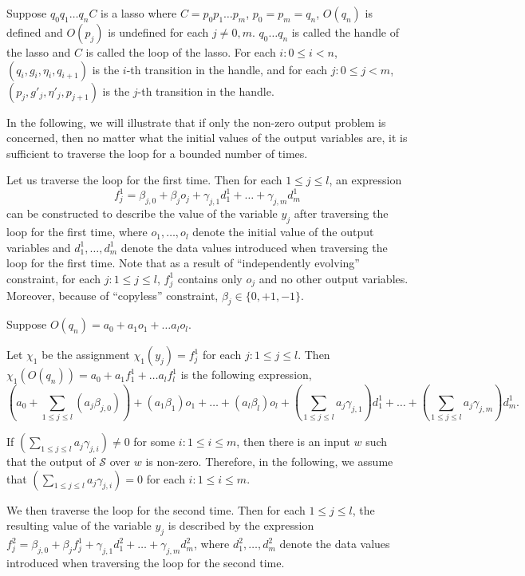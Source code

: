 \documentclass[runningheads,a4paper]{llncs}
\def\Ss{{\mathcal{S} }}
\begin{document}
Suppose $q_0 q_1 \dots q_n C$ is a lasso where $C=p_0 p_1 \dots p_m$, $p_0 = p_m=q_n$, $O(q_n)$ is defined and $O(p_j)$ is undefined for each $j \neq 0,m$. $q_0 \dots q_n$ is called the handle of the lasso and $C$ is called the loop of the lasso. For each $i: 0 \le i < n$, $(q_i, g_i, \eta_i, q_{i+1})$ is the $i$-th transition in the handle, and for each $j: 0 \le j < m$, $(p_j, g'_j, \eta'_j, p_{j+1})$ is the $j$-th transition in the handle. 

In the following, we will illustrate that if only the non-zero output problem is concerned, then no matter what the initial values of the output variables are, it is sufficient to traverse the loop for a bounded number of times.


Let us traverse the loop for the first time. Then for each $1 \le j \le l$, an expression 
\[f^1_{j} = \beta_{j,0} + \beta_{j} o_{j} + \gamma_{j,1} d^1_1 + \dots + \gamma_{j,m} d^1_m\] 
can be constructed to describe the value of the variable $y_{j}$ after traversing the loop for the first time, where $o_1,\dots,o_l$ denote the initial value of the output variables and $d^1_1, \dots, d^1_m$ denote the data values introduced when traversing the loop for the first time. Note that as a result of ``independently evolving'' constraint, for each $j: 1 \le j \le l$, $f^1_{j}$ contains only $o_{j}$ and no other output variables. Moreover, because of ``copyless'' constraint, $\beta_j \in \{0,+1,-1\}$.

Suppose $O(q_n)=a_0 + a_1 o_1 + \dots a_l o_l$. 

Let $\chi_1$ be the assignment $\chi_1(y_j)=f^1_j$ for each $j: 1\le j \le l$.
Then $\chi_1(O(q_n)) = a_0+ a_1 f^1_1 + \dots a_l f^1_l$ is the following expression,
\[
(a_0 + \sum \limits_{1 \le j \le l} (a_j\beta_{j,0})) +  (a_1 \beta_1) o_1 + \dots + (a_l \beta_l) o_l + (\sum \limits_{1 \le j \le l} a_j \gamma_{j,1}) d^1_1 + \dots + (\sum \limits_{1 \le j \le l} a_j \gamma_{j,m}) d^1_m.
\]

If $(\sum \limits_{1 \le j \le l} a_j \gamma_{j,i}) \neq 0$ for some $i: 1 \le i \le m$, then there is an input $w$ such that the output of $\Ss$ over $w$ is non-zero. Therefore, in the following, we assume that $(\sum \limits_{1 \le j \le l} a_j \gamma_{j,i}) = 0$ for each $i: 1 \le i \le m$.

We then traverse the loop for the second time. Then for each $1 \le j \le l$,  the resulting value of the variable $y_{j}$ is described by the expression $f^2_{j} = \beta_{j,0} + \beta_{j} f^1_{j} + \gamma_{j,1} d^2_1 + \dots + \gamma_{j,m} d^2_m$, where $d^2_1, \dots, d^2_m$ denote the data values introduced when traversing the loop for the second time. 
\end{document}
